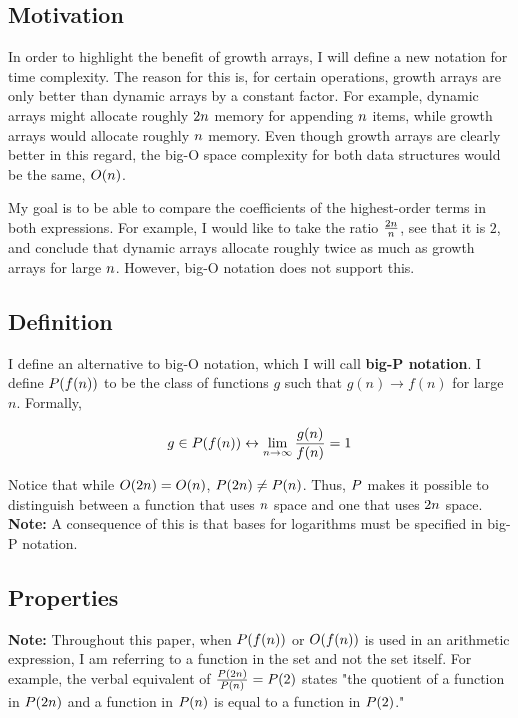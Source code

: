 \subsection{Motivation}

In order to highlight the benefit of growth arrays, I will define a new notation for time complexity. The reason for this is, for certain operations, growth arrays are only better than dynamic arrays by a constant factor. For example, dynamic arrays might allocate roughly $2n$ memory for appending $n$ items, while growth arrays would allocate roughly $n$ memory. Even though growth arrays are clearly better in this regard, the big-O space complexity for both data structures would be the same, $O(n)$.

My goal is to be able to compare the coefficients of the highest-order terms in both expressions. For example, I would like to take the ratio $\frac{2n}{n}$, see that it is $2$, and conclude that dynamic arrays allocate roughly twice as much as growth arrays for large $n$. However, big-O notation does not support this.

\subsection{Definition}

I define an alternative to big-O notation, which I will call \textbf{big-P notation}. I define $P(f(n))$ to be the class of functions $g$ such that $g(n) \to f(n)$ for large $n$. Formally,

$$
g \in P(f(n)) \leftrightarrow \lim_{n \to \infty} \frac{g(n)}{f(n)} = 1
$$

Notice that while $O(2n) = O(n)$, $P(2n) \neq P(n)$. Thus, $P$ makes it possible to distinguish between a function that uses $n$ space and one that uses $2n$ space. \textbf{Note:} A consequence of this is that bases for logarithms must be specified in big-P notation.

\subsection{Properties}

\textbf{Note:} Throughout this paper, when $P(f(n))$ or $O(f(n))$ is used in an arithmetic expression, I am referring to a function in the set and not the set itself. For example, the verbal equivalent of $\frac{P(2n)}{P(n)} = P(2)$ states "the quotient of a function in $P(2n)$ and a function in $P(n)$ is equal to a function in $P(2)$."

